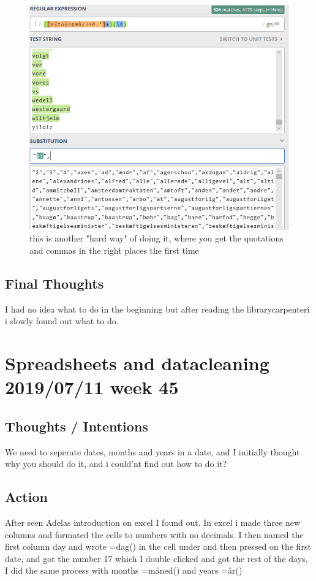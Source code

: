 \documentclass{article}
\begin{document}
\begin{figure}[H]
    \centering
    \includegraphics[width=\textwidth]{foto3.png}
    \caption{this is another "hard way" of doing it, where you get the quotations and commas in the right places the first time}
    \label{fig:bil3}
\end{figure}
\subsection{Final Thoughts} I had no idea what to do in the beginning but after reading the librarycarpenteri i slowly found out what to do.

\pagebreak{}

\section{Spreadsheets and datacleaning 2019/07/11 week 45}
\subsection{Thoughts / Intentions} We need to seperate dates, months and years in a date, and I initially thought why you should do it, and i could'nt find out how to do it?
\subsection{Action} After seen Adelas introduction on excel I found out. In excel i made three new columns and formated the cells to numbers with no decimals. I then named the first column day and wrote =dag() in the cell under and then pressed on the first date, and got the number 17 which I double clicked and got the rest of the days. I did the same process with months =måned() and years =år()
\end{document}
